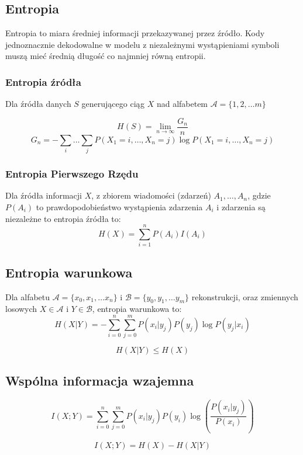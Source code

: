 \documentclass{../notatki}
\begin{document}
\subsection{Entropia}

Entropia to miara średniej informacji przekazywanej przez źródło.
Kody jednoznacznie dekodowalne w modelu z niezależnymi
wystąpieniami symboli muszą mieć średnią długość co najmniej
równą entropii.

\subsubsection{Entropia źródła}

Dla źródła danych $S$ generującego ciąg $X$ nad alfabetem
$\mathcal{A}=\{1, 2, \dots m\}$

$$
H(S) = \lim_{n \to \infty} \frac{G_n}{n}
$$
$$
G_n = - \sum_{i} \dots \sum_{j}P(X_1 = i, \dots, X_n = j) \log P(X_1
= i, \dots, X_n = j)
$$

\subsubsection{Entropia Pierwszego Rzędu}

Dla źródła informacji $X$, z zbiorem wiadomości (zdarzeń) $A_1, \dots, A_n$,
gdzie $P(A_i)$ to prawdopodobieństwo wystąpienia zdarzenia $A_i$ i
zdarzenia są niezależne to entropia źródła to:
$$
H(X) = \sum_{i=1}^{n}P(A_i)I(A_i)
$$

\subsection{Entropia warunkowa}

Dla alfabetu $\mathcal{A} = \{x_0, x_1, \dots x_n\}$ i $\mathcal{B} =
\{y_0, y_1, \dots y_m\}$
rekonstrukcji, oraz zmiennych
losowych $X \in \mathcal{A}$ i $Y \in \mathcal{B}$, entropia warunkowa
to:
$$
H(X|Y) = - \sum_{i = 0}^{n} \sum_{j =
0}^{m}P(x_i|y_j)P(y_j) \log P(y_j | x_i)
$$

$$
H(X|Y) \le H(X)
$$

\subsection{Wspólna informacja wzajemna}

$$
I(X; Y) = \sum_{i = 0}^{n} \sum_{j =
0}^{m} P(x_i | y_j)P(y_i) \log(\frac{P(x_i| y_j)}{P(x_i)})
$$

$$
I(X; Y) = H(X) - H(X|Y)
$$
\end{document}
